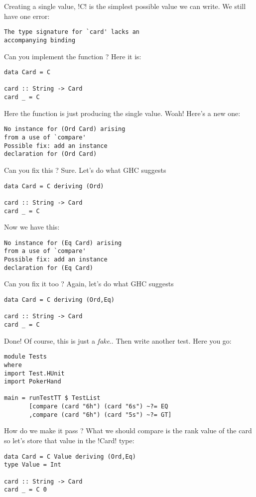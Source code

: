Creating a single value, \il!C! is the simplest possible value we can write.
\lhN \error We still have one error: 
\begin{verbatim}
The type signature for `card' lacks an 
accompanying binding
\end{verbatim}
Can you implement the function ?
\lhA \error Here it is:
\begin{lstlisting}[frame=single]
data Card = C 

card :: String -> Card
card _ = C
\end{lstlisting}
Here the function is just producing the single value.
\lhN \error Woah! Here's a new one:
\begin{verbatim}
No instance for (Ord Card) arising 
from a use of `compare' 
Possible fix: add an instance 
declaration for (Ord Card)
\end{verbatim}
Can you fix this ?
\lhA \error Sure. Let's do what GHC suggests
\begin{lstlisting}[frame=single]
data Card = C deriving (Ord)

card :: String -> Card
card _ = C
\end{lstlisting}
\lhN \error Now we have this:
\begin{verbatim}
No instance for (Eq Card) arising 
from a use of `compare' 
Possible fix: add an instance 
declaration for (Eq Card)
\end{verbatim}
Can you fix it too ?
\lhA \error Again, let's do what GHC suggests 
\begin{lstlisting}[frame=single]
data Card = C deriving (Ord,Eq)

card :: String -> Card
card _ = C
\end{lstlisting}
\success Done!
\lhN Of course, this is just a \emph{fake}..
\lhA Then write another test.
\lhN Here you go:
\begin{lstlisting}[frame=single]
module Tests
where 
import Test.HUnit
import PokerHand

main = runTestTT $ TestList 
       [compare (card "6h") (card "6s") ~?= EQ
       ,compare (card "6h") (card "5s") ~?= GT]
\end{lstlisting} %
How do we make it pass ?
\lhA \error What we should compare is the rank value of the card so let's store that value in the \il!Card! type:
\begin{lstlisting}[frame=single]
data Card = C Value deriving (Ord,Eq)
type Value = Int

card :: String -> Card
card _ = C 0
\end{lstlisting}

